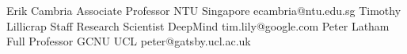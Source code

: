 %
%
%

\begin{referees}
		{Erik Cambria}
		{Associate Professor}
		{NTU Singapore}
		{ecambria@ntu.edu.sg}
		{}
		{Timothy Lillicrap}
		{Staff Research Scientist}
		{DeepMind}
		{tim.lily@google.com}
		{}
		{Peter Latham}
		{Full Professor}
		{GCNU UCL}
		{peter@gatsby.ucl.ac.uk}
		{}
\end{referees}